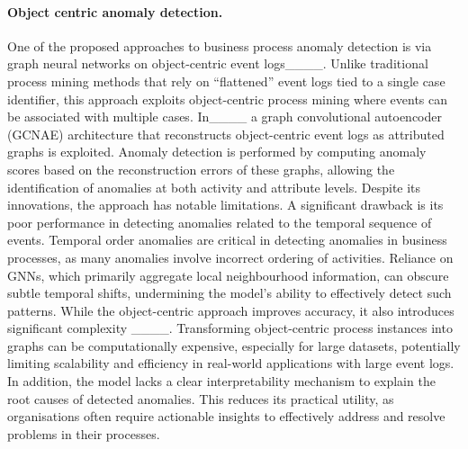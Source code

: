 \paragraph{Object centric anomaly detection.}
One of the proposed approaches to business process anomaly detection is via graph neural networks on object-centric event logs____. Unlike traditional process mining methods that rely on ``flattened'' event logs tied to a single case identifier, this approach exploits object-centric process mining where events can be associated with multiple cases. In____  a graph convolutional autoencoder (GCNAE) architecture that reconstructs object-centric event logs as attributed graphs is exploited. Anomaly detection is performed by computing anomaly scores based on the reconstruction errors of these graphs, allowing the identification of anomalies at both activity and attribute levels.
%
Despite its innovations, the approach has notable limitations. A significant drawback is its poor performance in detecting anomalies related to the temporal sequence of events. Temporal order anomalies are critical in detecting anomalies in business processes, as many anomalies involve incorrect ordering of activities. Reliance on GNNs, which primarily aggregate local neighbourhood information, can obscure subtle temporal shifts, undermining the model's ability to effectively detect such patterns.
%
While the object-centric approach improves accuracy, it also introduces significant complexity ____. Transforming object-centric process instances into graphs can be computationally expensive, especially for large datasets, potentially limiting scalability and efficiency in real-world applications with large event logs.
%
In addition, the model lacks a clear interpretability mechanism to explain the root causes of detected anomalies. This reduces its practical utility, as organisations often require actionable insights to effectively address and resolve problems in their processes.



